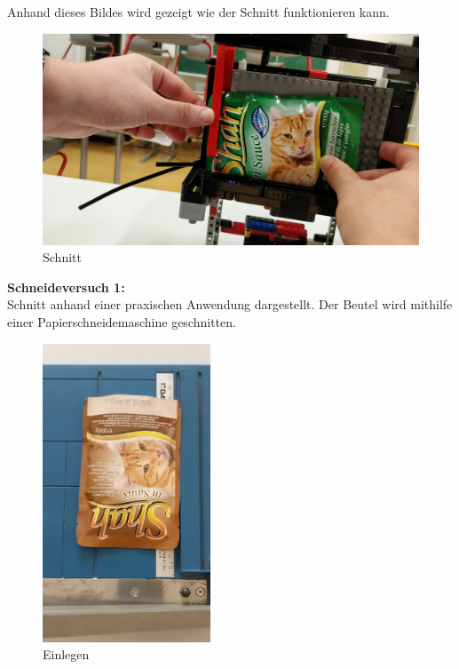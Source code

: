 \documentclass[a4paper,12pt]{scrartcl}
\begin{document}
Anhand dieses Bildes wird gezeigt wie der Schnitt funktionieren kann.

\begin{figure}[H]
\begin{center}
\includegraphics[width=13cm]{Bilder/Ablauf_1_png/Schnitt}
\caption{Schnitt}
\end{center}
\end{figure}
\newpage
\textbf{Schneideversuch 1:} \\

Schnitt anhand einer praxischen Anwendung dargestellt. Der Beutel wird mithilfe einer Papierschneidemaschine geschnitten.

\begin{figure}[H]
\begin{center}
\includegraphics[width=5cm]{Bilder/Schneideversuch_1.Art/Einlegen}
\caption{Einlegen}
\end{center}
\end{figure}
\end{document}
